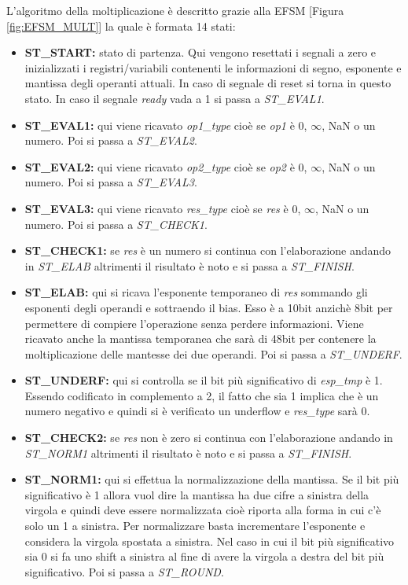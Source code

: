 \documentclass[]{IEEEtran}
\begin{document}
L'algoritmo della moltiplicazione è descritto grazie alla EFSM [Figura \ref{fig:EFSM_MULT}] la quale è formata 14 stati:
\begin{itemize}
    \item \textbf{ST\_START:} stato di partenza. Qui vengono resettati i segnali a zero e inizializzati i registri/variabili contenenti le informazioni di segno, esponente e mantissa degli operanti attuali. In caso di segnale di reset si torna in questo stato. In caso il segnale \textit{ready} vada a 1 si passa a \textit{ST\_EVAL1}.
    \item \textbf{ST\_EVAL1:} qui viene ricavato \textit{op1\_type} cioè se \textit{op1} è 0, $\infty$, NaN o un numero. Poi si passa a \textit{ST\_EVAL2}.
    \item \textbf{ST\_EVAL2:} qui viene ricavato \textit{op2\_type} cioè se \textit{op2} è 0, $\infty$, NaN o un numero. Poi si passa a \textit{ST\_EVAL3}.
    \item \textbf{ST\_EVAL3:} qui viene ricavato \textit{res\_type} cioè se \textit{res} è 0, $\infty$, NaN o un numero. Poi si passa a \textit{ST\_CHECK1}.
    \item \textbf{ST\_CHECK1:} se \textit{res} è un numero si continua con l'elaborazione andando in \textit{ST\_ELAB} altrimenti il risultato è noto e si passa a \textit{ST\_FINISH}. 
    \item \textbf{ST\_ELAB:} qui si ricava l'esponente temporaneo di \textit{res} sommando gli esponenti degli operandi e sottraendo il bias. Esso è a 10bit anzichè 8bit per permettere di compiere l'operazione senza perdere informazioni. Viene ricavato anche la mantissa temporanea che sarà di 48bit per contenere la moltiplicazione delle mantesse dei due operandi. Poi si passa a \textit{ST\_UNDERF}.
    \item \textbf{ST\_UNDERF:} qui si controlla se il bit più significativo di \textit{esp\_tmp} è 1. Essendo codificato in complemento a 2, il fatto che sia 1 implica che è un numero negativo e quindi si è verificato un underflow e \textit{res\_type} sarà 0.
    \item \textbf{ST\_CHECK2:} se \textit{res} non è zero si continua con l'elaborazione andando in \textit{ST\_NORM1} altrimenti il risultato è noto e si passa a \textit{ST\_FINISH}. 
    \item \textbf{ST\_NORM1:} qui si effettua la normalizzazione della mantissa. Se il bit più significativo è 1 allora vuol dire la mantissa ha due cifre a sinistra della virgola e quindi deve essere normalizzata cioè riporta alla forma in cui c'è solo un 1 a sinistra. Per normalizzare basta incrementare l'esponente e considera la virgola spostata a sinistra. Nel caso in cui il bit più significativo sia 0 si fa uno shift a sinistra al fine di avere la virgola a destra del bit più significativo. Poi si passa a \textit{ST\_ROUND}.

\end{itemize}
\end{document}
